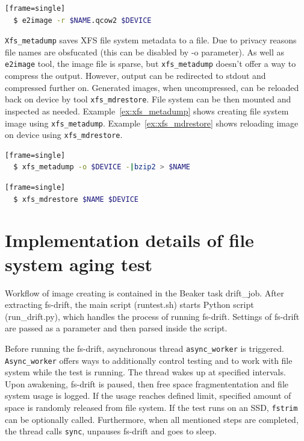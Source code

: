 \documentclass[
  color, %
  table, %
  lof,   %
  lot,   %
]{fithesis3}
\begin{document}
\begin{lstlisting}[language=bash, label={ex:e2image2}, caption={Reloading compressed image using \texttt{e2image}.}][frame=single]
  $ e2image -r $NAME.qcow2 $DEVICE
\end{lstlisting}

\texttt{Xfs\_metadump} saves XFS file system metadata to a file. Due to privacy reasons file names are obsfucated (this can be disabled by -o parameter). As well as \texttt{e2image} tool, the image file is sparse, but \texttt{xfs\_metadump} doesn't offer a way to compress the output. However, output can be redirected to stdout and compressed further on. Generated images, when uncompressed, can be reloaded back on device by tool \texttt{xfs\_mdrestore}. File system can be then mounted and inspected as needed. Example~\ref{ex:xfs_metadump} shows creating file system image using \texttt{xfs\_metadump}. Example~\ref{ex:xfs_mdrestore} shows reloading image on device using \texttt{xfs\_mdrestore}.

\begin{lstlisting}[language=bash, label={ex:xfs_metadump}, caption={Creating compressed image using \texttt{xfs\_metadump} and \texttt{bzip2}.}][frame=single]
  $ xfs_metadump -o $DEVICE -|bzip2 > $NAME
\end{lstlisting}

\begin{lstlisting}[language=bash, label={ex:xfs_mdrestore},caption={Reloading image using \texttt{xfs\_mdrestore}.}][frame=single]
  $ xfs_mdrestore $NAME $DEVICE
\end{lstlisting}

\section{Implementation details of file system aging test}
Workflow of image creating is contained in the Beaker task drift\_job. After extracting fs-drift, the main script (runtest.sh) starts Python script (run\_drift.py), which handles the process of running fs-drift. Settings of fs-drift are passed as a parameter and then parsed inside the script.

Before running the fs-drift, asynchronous thread \texttt{async\_worker} is triggered. \texttt{Async\_worker} offers ways to additionally control testing and to work with file system while the test is running. The thread wakes up at specified intervals. Upon awakening, fs-drift is paused, then free space fragmententation and file system usage is logged. If the usage reaches defined limit, specified amount of space is randomly released from file system. If the test runs on an SSD, \texttt{fstrim} can be optionally called. Furthermore, when all mentioned steps are completed, the thread calls \texttt{sync}, unpauses fs-drift and goes to sleep.
\end{document}
